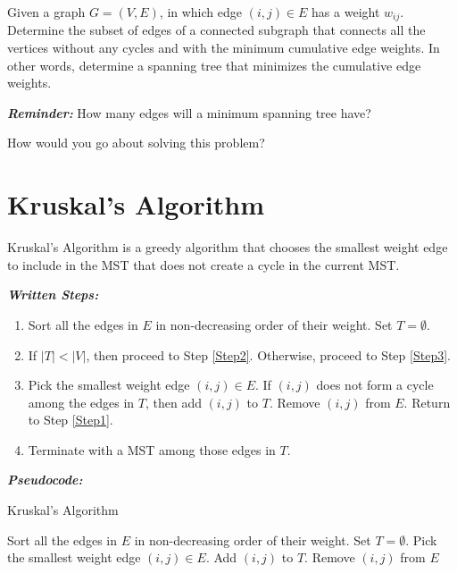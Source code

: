 \documentclass[12pt]{article}
\theoremstyle{definition}
\begin{document}
Given a graph $G = (V,E)$, in which edge $(i,j) \in E$ has a weight $w_{ij}$. Determine the subset of edges of a connected subgraph that connects all the vertices without any cycles and with the minimum cumulative edge weights. In other words, determine a spanning tree that minimizes the cumulative edge weights.

\textbf{\emph{Reminder:}} How many edges will a minimum spanning tree have?


\vfill

How would you go about solving this problem?

\vfill

\newpage

\section{Kruskal's Algorithm}

Kruskal's Algorithm is a greedy algorithm that chooses the smallest weight edge to include in the MST that does not create a cycle in the current MST.

\emph{\textbf{Written Steps:}}

\begin{enumerate}
	\item Sort all the edges in $E$ in non-decreasing order of their weight. Set $T = \emptyset$. \label{Step0}
	\item If $|T| < |V|$, then proceed to Step \ref{Step2}. Otherwise, proceed to Step \ref{Step3}. \label{Step1}
	\item Pick the smallest weight edge $(i,j) \in E$. If $(i,j)$ does not form a cycle among the edges in $T$, then add $(i,j)$ to $T$. Remove $(i,j)$ from $E$. Return to Step \ref{Step1}. \label{Step2}
	\item Terminate with a MST among those edges in $T$. \label{Step3}
\end{enumerate}


\emph{\textbf{Pseudocode:}}


\begin{algorithm}
\caption{Kruskal's Algorithm}
\begin{algorithmic} 
\STATE Sort all the edges in $E$ in non-decreasing order of their weight. 
\STATE Set $T = \emptyset$.
	\STATE Pick the smallest weight edge $(i,j) \in E$.
		\STATE Add $(i,j)$ to $T$.
	\ENDIF
	\STATE Remove $(i,j)$ from $E$
\ENDWHILE
\end{algorithmic}
\end{algorithm}
\end{document}
